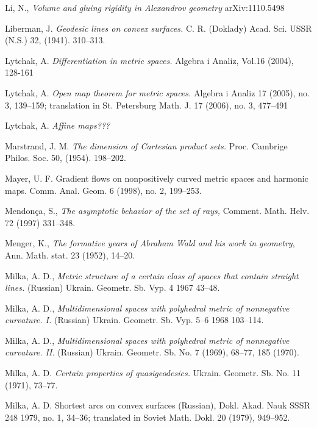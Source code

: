\begin{thebibliography}{52}
Li, N.,
\textit{Volume and gluing rigidity in Alexandrov geometry}
arXiv:1110.5498

Liberman, J. \textit{Geodesic lines on convex surfaces.}  C. R.
(Doklady) Acad. Sci. USSR (N.S.)  32,  (1941). 310--313.

Lytchak, A. \textit{Differentiation in metric spaces.}  Algebra i Analiz, Vol.16 (2004), 128-161 

Lytchak, A. \textit{Open map theorem for metric spaces.}  Algebra i Analiz  17  (2005),  no. 3, 139--159;  translation in  St. Petersburg Math. J.  17  (2006),  no. 3, 477--491 

 Lytchak, A. \textit{Affine maps???}

 Marstrand, J. M. \textit{The dimension of Cartesian product sets.}
Proc. Cambrige Philos. Soc. 50, (1954). 198--202.

 Mayer, U. F. Gradient flows on nonpositively curved metric spaces and harmonic maps. Comm. Anal. Geom. 6 (1998), no. 2, 199--253.

Mendon\c{c}a, S., \textit{The asymptotic behavior of the set of rays,} Comment. Math. Helv. 72 (1997) 331--348.


 Menger, K., \textit{The formative years of Abraham Wald and his work in geometry}, Ann. Math. stat. 23 (1952), 14--20.


Milka, A. D., \textit{Metric structure of a certain class of spaces that contain straight lines.} (Russian) Ukrain. Geometr. Sb. Vyp.  4  1967 43--48.

Milka, A. D., \textit{Multidimensional spaces with polyhedral metric of nonnegative curvature. I.}  (Russian)  Ukrain. Geometr. Sb. Vyp.  5--6 
1968 103--114. 

Milka, A. D., \textit{Multidimensional spaces with polyhedral metric of nonnegative curvature. II.}  (Russian)  Ukrain. Geometr. Sb. No. 7
(1969), 68--77, 185 (1970).

Milka, A. D. \textit{Certain properties of quasigeodesics.} 
Ukrain. Geometr. Sb. No. 11 (1971), 73--77.

 {Milka, A. D.} {Shortest arcs on convex surfaces} (Russian),  {Dokl. Akad.
Nauk SSSR}  {248}  {1979}, {no. 1}, {34--36};  translated in  Soviet Math. Dokl. 20 (1979), 949--952.


\end{thebibliography}
